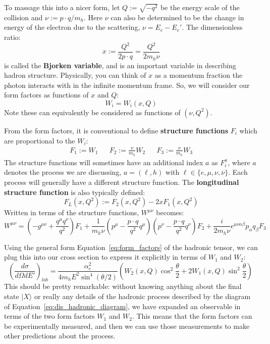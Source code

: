\documentclass[11pt, oneside]{article}   	%
\theoremstyle{definition}
\begin{document}
To massage this into a nicer form, let $Q := \sqrt{-q^2}$ be the energy scale of the collision and $\nu := p\cdot q / m_h$. Here 
$\nu$ can also be determined to be the change in energy of the electron due to the scattering, $\nu = E_e - E_e'$. The 
dimensionless ratio:
\begin{equation}
	x := \frac{Q^2}{2 p\cdot q} = \frac{Q^2}{2m_h\nu}
\end{equation}
is called the \textbf{Bjorken variable}, and is an important variable in describing hadron structure. Physically, you can think 
of $x$ as a momentum fraction the photon interacts with in the infinite momentum frame. So, we will consider our form factors 
as functions of $x$ and $Q$:
\begin{equation}
	W_i = W_i(x, Q)
\end{equation}
Note these can equivalently be considered as functions of $(\nu, Q^2)$. 

From the form factors, it is conventional to define \textbf{structure functions} $F_i$ which are proportional to the $W_i$:
\begin{align}
	F_1 := W_1 && F_2 := \frac{\nu}{m_h} W_2 && F_3 := \frac{\nu}{m_h} W_3
\end{align}
The structure functions will sometimes have an additional index $a$ as $F_i^a$, where $a$ denotes the process we are 
discussing, $a = (\ell, h)$ with $\ell \in \{e, \mu, \nu, \overline{\nu}\}$. Each process will generally have a different structure 
function. The \textbf{longitudinal structure function} is also typically defined:
\begin{equation}
	F_L(x, Q^2) := F_2(x, Q^2) - 2x F_1(x, Q^2)
\end{equation}
Written in terms of the structure functions, $W^{\mu\nu}$ becomes:
\begin{equation}
	W^{\mu\nu} = \left(-g^{\mu\nu} + \frac{q^\mu q^\nu}{q^2}\right) F_1 + \frac{1}{m_h\nu}\left(p^\mu - 
	\frac{p\cdot q}{q^2}q^\mu\right)\left(p^\nu - \frac{p\cdot q}{q^2}q^\nu\right) F_2 + \frac{i}{2m_h\nu} 
	\epsilon^{\mu\nu\alpha\beta}p_\alpha q_\beta F_3
\end{equation}

Using the general form Equation~\ref{eq:form_factors} of the hadronic tensor, we can plug this into our cross section to 
express it explicitly in terms of $W_1$ and $W_2$:
\begin{equation}
	\left(\frac{d\sigma}{d\Omega dE'}\right)_{lab} = \frac{\alpha_e^2}{4 m_h E^2\sin^4(\theta / 2)}\left(W_2(x, Q)
	\cos^2\frac{\theta}{2} + 2W_1(x, Q)\sin^2\frac{\theta}{2}\right)~
	\label{eq:sigma_ff}
\end{equation}
This should be pretty remarkable: without knowing anything about the final state $|X\rangle$ or really any details of the 
hadronic process described by the diagram of Equation~\ref{eq:dis_hadronic_diagram}, we have expanded an observable in 
terms of the two form factors $W_1$ and $W_2$. This means that the form factors can be experimentally measured, and then 
we can use those measurements to make other predictions about the process. 
\end{document}

